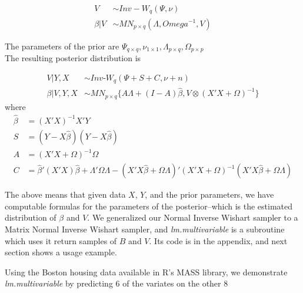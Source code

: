 \documentclass[english]{report}
\begin{document}
\begin{align*}
	V &\sim  Inv-W_q(\Psi,\nu)\\
	\beta|V &\sim MN_{p \times q}(\Lambda, Omega^{-1}, V)
\end{align*}

The parameters of the prior are $\Psi_{q\times q}, \nu_{1\times 1}, \Lambda_{p\times q}, \Omega_{p\times p}$\\

The resulting posterior distribution is \cite{Lysy}

\begin{align*}
	V|Y,X &\sim  Inv\text{-}W_q(\Psi+S+C,\nu+n)\\
	\beta|V,Y,X &\sim MN_{p \times q}\{A\Lambda + (I-A)\hat{\beta}, V  \otimes (X'X +\Omega)^{-1}\}
\end{align*}
where 
\begin{align*}
\hat{\beta} &= (X'X)^{-1}X'Y\\
S &= (Y-X\hat{\beta})(Y-X\hat{\beta})\\ 
A &= (X'X + \Omega)^{-1}\Omega\\
C &= \hat{\beta}'(X'X)\hat{\beta} + \Lambda'\Omega\Lambda - (X'X\hat{\beta} + \Omega\Lambda)'(X'X+\Omega)^{-1}(X'X\hat{\beta} + \Omega\Lambda)
\end{align*}

The above means that given data $X$, $Y$, and the prior parameters, we have computable formulas for the parameters of the posterior--which is the estimated distribution of $\beta$ and $V$. We generalized our Normal Inverse Wishart sampler to a Matrix Normal Inverse Wishart sampler, and \emph{lm.multivariable} is a subroutine which uses it return samples of $B$ and $V$. Its code is in the appendix, and next section shows a usage example.


Using the Boston housing data available in R's MASS library, we demonstrate \emph{lm.multivariable} by predicting 6 of the variates on the other 8\\
\end{document}
